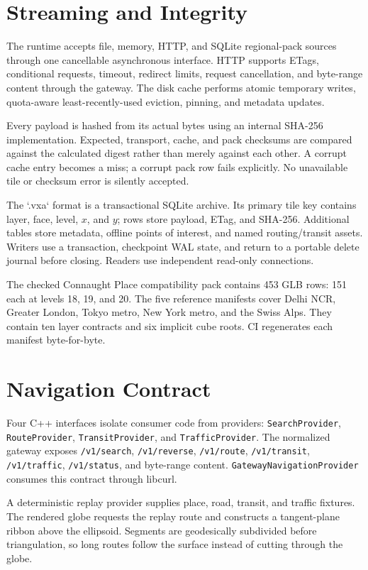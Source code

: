 \documentclass[12pt]{article}
\begin{document}
\section{Streaming and Integrity}
The runtime accepts file, memory, HTTP, and SQLite regional-pack sources through one cancellable
asynchronous interface. HTTP supports ETags, conditional requests, timeout, redirect limits,
request cancellation, and byte-range content through the gateway. The disk cache performs atomic
temporary writes, quota-aware least-recently-used eviction, pinning, and metadata updates.

Every payload is hashed from its actual bytes using an internal SHA-256 implementation. Expected,
transport, cache, and pack checksums are compared against the calculated digest rather than merely
against each other. A corrupt cache entry becomes a miss; a corrupt pack row fails explicitly.
No unavailable tile or checksum error is silently accepted.

The `.vxa` format is a transactional SQLite archive. Its primary tile key contains layer, face,
level, $x$, and $y$; rows store payload, ETag, and SHA-256. Additional tables store metadata,
offline points of interest, and named routing/transit assets. Writers use a transaction, checkpoint
WAL state, and return to a portable delete journal before closing. Readers use independent
read-only connections.

The checked Connaught Place compatibility pack contains 453 GLB rows: 151 each at levels 18, 19,
and 20. The five reference manifests cover Delhi NCR, Greater London, Tokyo metro, New York metro,
and the Swiss Alps. They contain ten layer contracts and six implicit cube roots. CI regenerates
each manifest byte-for-byte.

\section{Navigation Contract}
Four C++ interfaces isolate consumer code from providers: \texttt{SearchProvider},
\texttt{RouteProvider}, \texttt{TransitProvider}, and \texttt{TrafficProvider}. The normalized
gateway exposes \texttt{/v1/search}, \texttt{/v1/reverse}, \texttt{/v1/route},
\texttt{/v1/transit}, \texttt{/v1/traffic}, \texttt{/v1/status}, and byte-range content.
\texttt{GatewayNavigationProvider} consumes this contract through libcurl.

A deterministic replay provider supplies place, road, transit, and traffic fixtures. The rendered
globe requests the replay route and constructs a tangent-plane ribbon above the ellipsoid.
Segments are geodesically subdivided before triangulation, so long routes follow the surface
instead of cutting through the globe.
\end{document}
